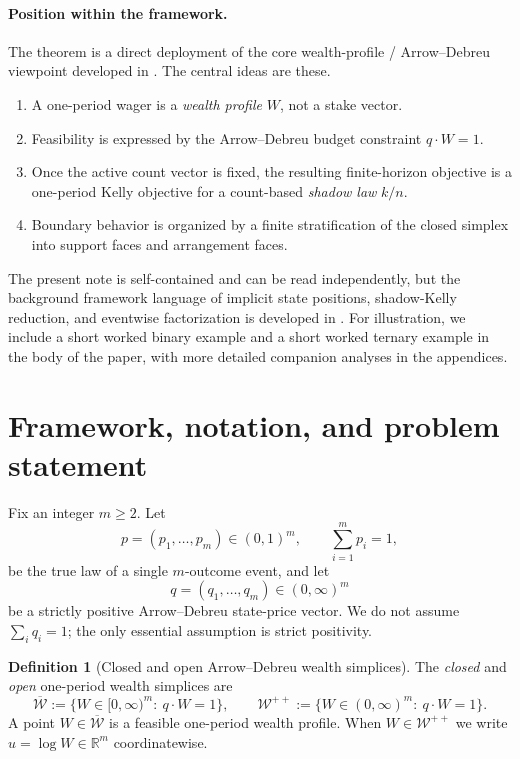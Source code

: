 \documentclass[11pt]{article}
\theoremstyle{definition}
\newtheorem{definition}[definition]{Definition}
\newcommand{\R}{\mathbb{R}}
\newcommand{\1}{\mathbf{1}}
\begin{document}
\paragraph{Position within the framework.}
The theorem is a direct deployment of the core wealth-profile / Arrow--Debreu viewpoint developed in \cite{Long2026Single,Long2026Simultaneous,Long2026Parlay}. The central ideas are these.
\begin{enumerate}[label=(\roman*), itemsep=2pt]
  \item A one-period wager is a \emph{wealth profile} $W$, not a stake vector.
  \item Feasibility is expressed by the Arrow--Debreu budget constraint $q\cdot W=1$.
  \item Once the active count vector is fixed, the resulting finite-horizon objective is a one-period Kelly objective for a count-based \emph{shadow law} $k/n$.
  \item Boundary behavior is organized by a finite stratification of the closed simplex into support faces and arrangement faces.
\end{enumerate}
The present note is self-contained and can be read independently, but the background framework language of implicit state positions, shadow-Kelly reduction, and eventwise factorization is developed in \cite{Long2026Single,Long2026Simultaneous,Long2026Parlay}.
For illustration, we include a short worked binary example and a short worked ternary example in the body of the paper, with more detailed companion analyses in the appendices.

\section{Framework, notation, and problem statement}

Fix an integer $m\ge 2$. Let
\[
p=(p_1,\dots,p_m)\in(0,1)^m,\qquad \sum_{i=1}^m p_i=1,
\]
be the true law of a single $m$-outcome event, and let
\[
q=(q_1,\dots,q_m)\in(0,\infty)^m
\]
be a strictly positive Arrow--Debreu state-price vector. We do not assume $\sum_i q_i=1$; the only essential assumption is strict positivity.

\begin{definition}[Closed and open Arrow--Debreu wealth simplices]
The \emph{closed} and \emph{open} one-period wealth simplices are
\[
\overline{\mathcal W}:=\{W\in[0,\infty)^m:\ q\cdot W=1\},
\qquad
\mathcal W^{++}:=\{W\in(0,\infty)^m:\ q\cdot W=1\}.
\]
A point $W\in\overline{\mathcal W}$ is a feasible one-period wealth profile. When $W\in\mathcal W^{++}$ we write $u=\log W\in\R^m$ coordinatewise.
\end{definition}
\end{document}
